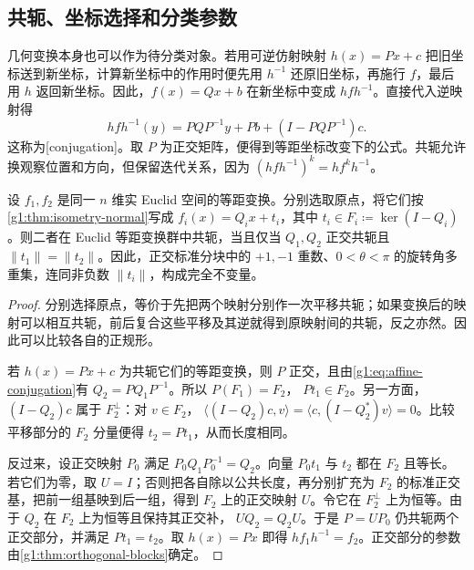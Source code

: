 \subsection{共轭、坐标选择和分类参数}
\label{g1:subsec:0104:02}

几何变换本身也可以作为待分类对象。若用可逆仿射映射 \(h(x)=Px+c\) 把旧坐标送到新坐标，计算新坐标中的作用时便先用 \(h^{-1}\) 还原旧坐标，再施行 \(f\)，最后用 \(h\) 返回新坐标。因此，\(f(x)=Qx+b\) 在新坐标中变成 \(hfh^{-1}\)。直接代入逆映射得
\begin{equation}\label{g1:eq:affine-conjugation}
	hfh^{-1}(y)=PQP^{-1}y+Pb+(I-PQP^{-1})c.
\end{equation}
这称为[conjugation]。取 \(P\) 为正交矩阵，便得到等距坐标改变下的公式。共轭允许换观察位置和方向，但保留迭代关系，因为 \((hfh^{-1})^k=hf^kh^{-1}\)。

\begin{proposition}\label{g1:prop:isometry-conjugacy}
	设 \(f_1,f_2\) 是同一 \(n\) 维实 Euclid 空间的等距变换。分别选取原点，将它们按\cref{g1:thm:isometry-normal}写成 \(f_i(x)=Q_ix+t_i\)，其中 \(t_i\in F_i\coloneqq\ker(I-Q_i)\)。则二者在 Euclid 等距变换群中共轭，当且仅当 \(Q_1,Q_2\) 正交共轭且 \(\lVert t_1\rVert=\lVert t_2\rVert\)。因此，正交标准分块中的 \(+1,-1\) 重数、\(0<\theta<\pi\) 的旋转角多重集，连同非负数 \(\lVert t_i\rVert\)，构成完全不变量。
\end{proposition}
\begin{proof}
	分别选择原点，等价于先把两个映射分别作一次平移共轭；如果变换后的映射可以相互共轭，前后复合这些平移及其逆就得到原映射间的共轭，反之亦然。因此可以比较各自的正规形。

	若 \(h(x)=Px+c\) 为共轭它们的等距变换，则 \(P\) 正交，且由\eqref{g1:eq:affine-conjugation}有 \(Q_2=PQ_1P^{-1}\)。所以 \(P(F_1)=F_2\)， \(Pt_1\in F_2\)。另一方面，\((I-Q_2)c\) 属于 \(F_2^\perp\)：对 \(v\in F_2\)， \(\langle(I-Q_2)c,v\rangle=\langle c,(I-Q_2^*)v\rangle=0\)。比较平移部分的 \(F_2\) 分量便得 \(t_2=Pt_1\)，从而长度相同。

	反过来，设正交映射 \(P_0\) 满足 \(P_0Q_1P_0^{-1}=Q_2\)。向量 \(P_0t_1\) 与 \(t_2\) 都在 \(F_2\) 且等长。若它们为零，取 \(U=I\)；否则把各自除以公共长度，再分别扩充为 \(F_2\) 的标准正交基，把前一组基映到后一组，得到 \(F_2\) 上的正交映射 \(U\)。令它在 \(F_2^\perp\) 上为恒等。由于 \(Q_2\) 在 \(F_2\) 上为恒等且保持其正交补， \(UQ_2=Q_2U\)。于是 \(P=UP_0\) 仍共轭两个正交部分，并满足 \(Pt_1=t_2\)。取 \(h(x)=Px\) 即得 \(hf_1h^{-1}=f_2\)。正交部分的参数由\cref{g1:thm:orthogonal-blocks}确定。
\end{proof}


